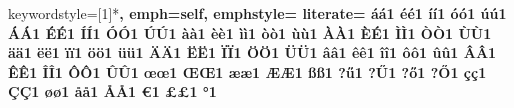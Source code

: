 {{				keywordstyle=[1]*\color{PSD-fonctions}\bfseries,
				emph={self},
				emphstyle={\color{PSD-self}\slshape}
            literate=%
                {á}{{\'a}}1 {é}{{\'e}}1 {í}{{\'i}}1 {ó}{{\'o}}1 {ú}{{\'u}}1
                {Á}{{\'A}}1 {É}{{\'E}}1 {Í}{{\'I}}1 {Ó}{{\'O}}1 {Ú}{{\'U}}1
                {à}{{\`a}}1 {è}{{\`e}}1 {ì}{{\`i}}1 {ò}{{\`o}}1 {ù}{{\`u}}1
                {À}{{\`A}}1 {È}{{\'E}}1 {Ì}{{\`I}}1 {Ò}{{\`O}}1 {Ù}{{\`U}}1
                {ä}{{\"a}}1 {ë}{{\"e}}1 {ï}{{\"i}}1 {ö}{{\"o}}1 {ü}{{\"u}}1
                {Ä}{{\"A}}1 {Ë}{{\"E}}1 {Ï}{{\"I}}1 {Ö}{{\"O}}1 {Ü}{{\"U}}1
                {â}{{\^a}}1 {ê}{{\^e}}1 {î}{{\^i}}1 {ô}{{\^o}}1 {û}{{\^u}}1
                {Â}{{\^A}}1 {Ê}{{\^E}}1 {Î}{{\^I}}1 {Ô}{{\^O}}1 {Û}{{\^U}}1
                {œ}{{\oe}}1 {Œ}{{\OE}}1 {æ}{{\ae}}1 {Æ}{{\AE}}1 {ß}{{\ss}}1
                {?}{{\H{u}}}1 {?}{{\H{U}}}1 {?}{{\H{o}}}1 {?}{{\H{O}}}1
                {ç}{{\c c}}1 {Ç}{{\c C}}1 {ø}{{\o}}1 {å}{{\r a}}1 {Å}{{\r A}}1
                {€}{{\EUR}}1 {£}{{\pounds}}1
                {°}{{\degres{}}}1
			}
		}
		{	\endminipage
		}

\endinput
